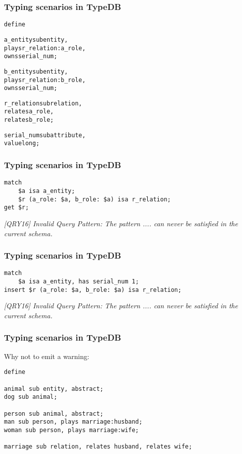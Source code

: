 \documentclass{beamer}
\begin{document}
\begin{frame}[fragile]\frametitle{Typing scenarios in TypeDB}

  \begin{alltt}
define

a_entity sub entity,
    plays r_relation:a_role,
    owns serial_num;

b_entity sub entity,
    plays r_relation:b_role,
    owns serial_num;

r_relation sub relation,
    relates a_role,
    relates b_role;

serial_num sub attribute,
    value long;
  \end{alltt}
  
\end{frame}


\begin{frame}[fragile]\frametitle{Typing scenarios in TypeDB}

  \begin{verbatim}
match
    $a isa a_entity; 
    $r (a_role: $a, b_role: $a) isa r_relation;
get $r;
\end{verbatim}
  \emph{[QRY16] Invalid Query Pattern: The pattern  .... can never be satisfied in the current schema.}

\end{frame}


\begin{frame}[fragile]\frametitle{Typing scenarios in TypeDB}

  \begin{verbatim}
match
    $a isa a_entity, has serial_num 1; 
insert $r (a_role: $a, b_role: $a) isa r_relation;
\end{verbatim}
  \emph{[QRY16] Invalid Query Pattern: The pattern  .... can never be satisfied in the current schema.}

\vspace{3mm}

\end{frame}


\begin{frame}[fragile]\frametitle{Typing scenarios in TypeDB}

Why not to emit a warning:

  \begin{verbatim}
define

animal sub entity, abstract;
dog sub animal;

person sub animal, abstract;
man sub person, plays marriage:husband;
woman sub person, plays marriage:wife;

marriage sub relation, relates husband, relates wife;
\end{verbatim}


\vspace{3mm}

\end{frame}
\end{document}
